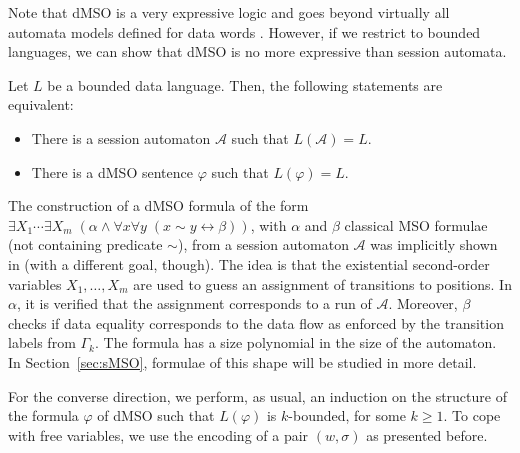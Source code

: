 \documentclass{LMCS}
\def\A{\mathcal A}
\renewcommand{\phi}{\varphi}
\newcommand{\runf}{\alpha}
\newcommand{\dataf}{\beta}
\begin{document}
Note that dMSO is a very expressive logic and goes beyond virtually
all automata models defined for data words
\cite{Neven2004,Segoufin06,BojanczykDMSS11,Colcombet2011}.  However,
if we restrict to bounded languages, we can show that dMSO
is no more expressive than session automata.

\begin{thm}\label{thm:dMSO}
  Let $L$ be a bounded data language. Then, the following statements are
  equivalent:
  \begin{itemize}
  \item There is a session automaton $\A$ such that $L(\A) = L$.
  \item There is a dMSO sentence $\phi$ such that $L(\phi) = L$.
  \end{itemize}
\end{thm}
\proof The construction of a dMSO formula of the form $\exists X_1
\cdots \exists X_m\; (\runf \wedge \forall x\forall y\;(x \sim y
\leftrightarrow \dataf))$, with $\runf$ and $\dataf$ classical MSO
formulae (not containing predicate $\sim$), from a session automaton
$\A$ was implicitly shown in \cite{BCGK-fossacs12} (with a different
goal, though). The idea is that the existential second-order variables
$X_1,\ldots,X_m$ are used to guess an assignment of transitions to
positions. In $\runf$, it is verified that the assignment corresponds
to a run of $\A$. Moreover, $\dataf$ checks if data equality
corresponds to the data flow as enforced by the transition labels from
$\Gamma_k$. The formula has a size polynomial in the size of the
automaton. In Section~\ref{sec:sMSO}, formulae of this shape will be studied
in more detail.

For the converse direction, we perform, as usual, an induction on the
structure of the formula $\phi$ of dMSO such that $L(\phi)$ is
$k$-bounded, for some $k \ge 1$. To cope with free variables, we use the
encoding of a pair $(w,\sigma)$ as presented before.
\end{document}
